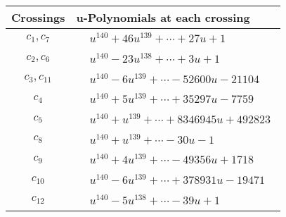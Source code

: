 \documentclass[1p]{elsarticle_modified}
\theoremstyle{definition}
\begin{document}
\begin{tabular}{m{50pt}|m{274pt}}
Crossings & \hspace{64pt}u-Polynomials at each crossing \\
\hline $$\begin{aligned}c_{1},c_{7}\end{aligned}$$&$\begin{aligned}
&u^{140}+46 u^{139}+\cdots+27 u+1
\end{aligned}$\\
\hline $$\begin{aligned}c_{2},c_{6}\end{aligned}$$&$\begin{aligned}
&u^{140}-23 u^{138}+\cdots+3 u+1
\end{aligned}$\\
\hline $$\begin{aligned}c_{3},c_{11}\end{aligned}$$&$\begin{aligned}
&u^{140}-6 u^{139}+\cdots-52600 u-21104
\end{aligned}$\\
\hline $$\begin{aligned}c_{4}\end{aligned}$$&$\begin{aligned}
&u^{140}+5 u^{139}+\cdots+35297 u-7759
\end{aligned}$\\
\hline $$\begin{aligned}c_{5}\end{aligned}$$&$\begin{aligned}
&u^{140}+u^{139}+\cdots+8346945 u+492823
\end{aligned}$\\
\hline $$\begin{aligned}c_{8}\end{aligned}$$&$\begin{aligned}
&u^{140}+u^{139}+\cdots-30 u-1
\end{aligned}$\\
\hline $$\begin{aligned}c_{9}\end{aligned}$$&$\begin{aligned}
&u^{140}+4 u^{139}+\cdots-49356 u+1718
\end{aligned}$\\
\hline $$\begin{aligned}c_{10}\end{aligned}$$&$\begin{aligned}
&u^{140}-6 u^{139}+\cdots+378931 u-19471
\end{aligned}$\\
\hline $$\begin{aligned}c_{12}\end{aligned}$$&$\begin{aligned}
&u^{140}-5 u^{138}+\cdots-39 u+1
\end{aligned}$\\
\hline
\end{tabular}\\~\\
\end{document}
